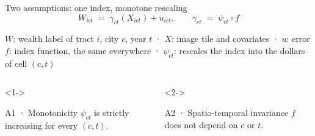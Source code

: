 \documentclass[10pt,aspectratio=169]{beamer}
\begin{document}
\begin{frame}{Two assumptions: one index, monotone rescaling}
\[
  W_{ict} \;=\; \gamma_{ct}(X_{ict}) + u_{ict},
  \qquad
  \gamma_{ct} \;=\; \psi_{ct}\circ f
\]
{\footnotesize\centering
$W$: wealth label of tract $i$, city $c$, year $t$ \;·\; $X$: image tile and covariates \;·\; $u$: error\\[2pt]
$f$: index function, the same everywhere \;·\; $\psi_{ct}$: rescales the index into the dollars of cell $(c,t)$\par}
\medskip
\begin{columns}[T]
\begin{uncoverenv}<1->
\begin{tbox}[blue]{A1 · Monotonicity}
\footnotesize $\psi_{ct}$ is strictly increasing for every $(c,t)$.\\[1pt]
\end{tbox}
\end{uncoverenv}
\begin{uncoverenv}<2->
\begin{tbox}[blue]{A2 · Spatio-temporal invariance}
\footnotesize $f$ does not depend on $c$ or $t$.\\[1pt]
\end{tbox}
\end{uncoverenv}
\end{columns}
\end{frame}
\end{document}
